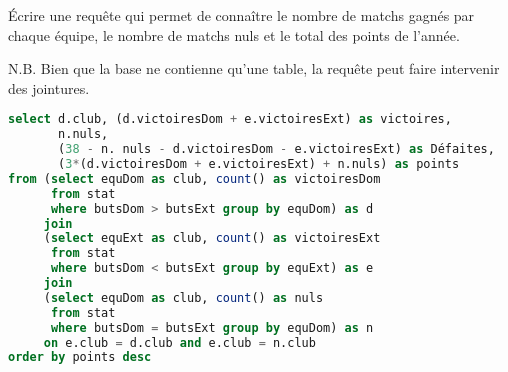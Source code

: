 \begin{Exercise}
Écrire une requête qui permet de connaître le nombre de matchs gagnés par chaque équipe, le nombre de matchs nuls et le total des points de l'année. 

N.B. Bien que la base ne contienne qu'une table, la requête peut faire intervenir des jointures.
\end{Exercise}
\begin{Answer}
\begin{lstlisting}[language=SQL]
select d.club, (d.victoiresDom + e.victoiresExt) as victoires,
       n.nuls, 
       (38 - n. nuls - d.victoiresDom - e.victoiresExt) as Défaites, 
       (3*(d.victoiresDom + e.victoiresExt) + n.nuls) as points
from (select equDom as club, count() as victoiresDom
      from stat 
      where butsDom > butsExt group by equDom) as d
	 join
	 (select equExt as club, count() as victoiresExt
      from stat 
      where butsDom < butsExt group by equExt) as e
	 join
	 (select equDom as club, count() as nuls
      from stat 
      where butsDom = butsExt group by equDom) as n
	 on e.club = d.club and e.club = n.club
order by points desc
\end{lstlisting}
\end{Answer}
\newpage


